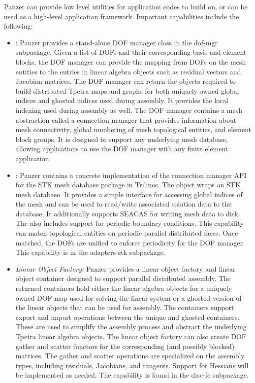Panzer can provide low level utilities for application codes to build on, or can be used as a high-level application framework. Important capabilities include the following:
\begin{itemize}
\item {}: Panzer provides a stand-alone DOF manager class in the dof-mgr subpackage. Given a list of DOFs and their corresponding basis and element blocks, the DOF manager can provide the mapping from DOFs on the mesh entities to the entries in linear algebra objects such as residual vectors and Jacobian matrices. The DOF manager can return the objects required to build distributed Tpetra
maps and graphs for both uniquely owned global indices and ghosted indices used during assembly.
It provides the local indexing used during assembly as well. The DOF manager contains a mesh abstraction called a connection manager that provides information about mesh connectivity, global numbering of mesh topological entities, and element block groups. It is designed to support any underlying mesh database, allowing applications to use the DOF manager with any finite element application.
\item {}: Panzer contains a concrete implementation of the connection manager API for the STK mesh database package in Trilinos. The  object wraps an STK mesh database. It provides a simple interface for accessing global indices of the mesh and can be used to read/write associated solution data to the database. It additionally supports SEACAS for writing mesh data to disk. The  also includes support for periodic boundary conditions.  This capability can match topological entities on periodic parallel distributed faces. Once matched, the DOFs are unified to enforce periodicity for the DOF manager. This capability is in the adapters-stk subpackage.
\item \emph{Linear Object Factory:} Panzer provides a linear object factory and linear object container designed to support parallel distributed assembly.
The returned containers hold either the linear algebra objects for a uniquely owned DOF map used for solving the linear system or a ghosted version of the linear objects that can be used for assembly. The containers support export and import operations between the unique and ghosted containers. These are used to simplify the assembly process and abstract the underlying Tpetra linear algebra objects. %
The linear object factory can also create DOF gather and scatter functors for the corresponding (and possibly blocked) matrices. The gather and scatter operations are specialized on the assembly types, including residuals, Jacobians, and tangents.
Support for Hessians will be implemented as needed.
The capability is found in the disc-fe subpackage.


\end{itemize}
